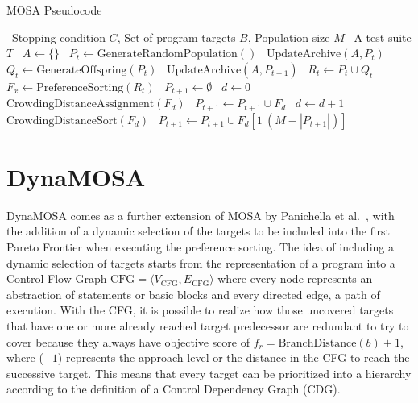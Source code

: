 \documentclass[%
  chapterprefix=false,%
  open=right,%
  twoside=true,%
  paper=a4,%
  logofile={Figures/logo.png},%
  thesistype=master,%
  UKenglish,%
]{se2thesis}
\begin{document}
\begin{algorithm}[htb]
  \centering
  \caption{MOSA Pseudocode}\label{alg:MOSApseudo}
  \begin{algorithmic}[1]
    \Require~Stopping condition \(C\), Set of program targets \(B\), Population size \(M\)
    \Ensure~A test suite \(T\)
    \State~\(A \gets \{\}\)
    \State~\(P_t \gets \text{GenerateRandomPopulation}()\)
    \State~\(\text{UpdateArchive}(A, P_t)\)
      \State~\(Q_t \gets \text{GenerateOffspring}(P_t)\)
      \State~\(\text{UpdateArchive}(A, P_{t+1})\)
      \State~\(R_t \gets P_t \cup Q_t\)
      \State~\(F_x \gets \text{PreferenceSorting}(R_t)\)
      \State~\(P_{t+1} \gets \emptyset \)
      \State~\(d \gets 0\)
        \State~\(\text{CrowdingDistanceAssignment}(F_d)\)
        \State~\(P_{t+1} \gets P_{t+1} \cup F_d\)
        \State~\(d \gets d + 1\)
      \EndWhile\@
      \State~\(\text{CrowdingDistanceSort}(F_d)\)
      \State~\(P_{t+1} \gets P_{t+1} \cup F_d[1\: (M - |P_{t+1}|)]\)
    \EndWhile\@
  \end{algorithmic}
\end{algorithm}

\section{DynaMOSA}\label{sec:dynamosa}

DynaMOSA comes as a further extension of MOSA by Panichella et al.~\cite{DBLP:journals/tse/PanichellaKT18}, with the addition of a dynamic selection of the targets to be included into the first Pareto Frontier when executing the preference sorting.
The idea of including a dynamic selection of targets starts from the representation of a program into a Control Flow Graph \(\text{CFG} = \langle V_{\text{CFG}}, E_{\text{CFG}} \rangle\) where every node represents an abstraction of statements or basic blocks and every directed edge, a path of execution.
With the CFG, it is possible to realize how those uncovered targets that have one or more already reached target predecessor are redundant to try to cover because they always have objective score of \(f_r = \text{BranchDistance}(b) + 1\), where (\(+1\)) represents the approach level or the distance in the CFG to reach the successive target.
This means that every target can be prioritized into a hierarchy according to the definition of a Control Dependency Graph (CDG).
\end{document}
